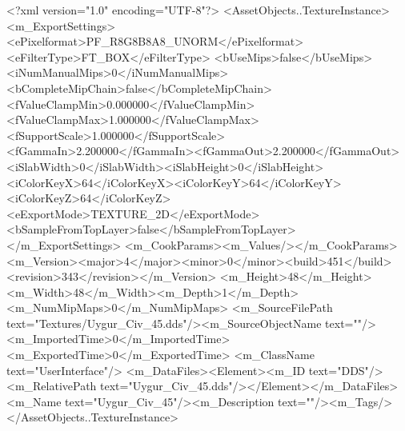 <?xml version="1.0" encoding="UTF-8"?>
<AssetObjects..TextureInstance>
  <m_ExportSettings>
    <ePixelformat>PF_R8G8B8A8_UNORM</ePixelformat><eFilterType>FT_BOX</eFilterType>
    <bUseMips>false</bUseMips><iNumManualMips>0</iNumManualMips><bCompleteMipChain>false</bCompleteMipChain>
    <fValueClampMin>0.000000</fValueClampMin><fValueClampMax>1.000000</fValueClampMax><fSupportScale>1.000000</fSupportScale>
    <fGammaIn>2.200000</fGammaIn><fGammaOut>2.200000</fGammaOut><iSlabWidth>0</iSlabWidth><iSlabHeight>0</iSlabHeight>
    <iColorKeyX>64</iColorKeyX><iColorKeyY>64</iColorKeyY><iColorKeyZ>64</iColorKeyZ>
    <eExportMode>TEXTURE_2D</eExportMode><bSampleFromTopLayer>false</bSampleFromTopLayer>
  </m_ExportSettings>
  <m_CookParams><m_Values/></m_CookParams>
  <m_Version><major>4</major><minor>0</minor><build>451</build><revision>343</revision></m_Version>
  <m_Height>48</m_Height><m_Width>48</m_Width><m_Depth>1</m_Depth><m_NumMipMaps>0</m_NumMipMaps>
  <m_SourceFilePath text="Textures/Uygur_Civ_45.dds"/><m_SourceObjectName text=""/>
  <m_ImportedTime>0</m_ImportedTime><m_ExportedTime>0</m_ExportedTime>
  <m_ClassName text="UserInterface"/>
  <m_DataFiles><Element><m_ID text="DDS"/><m_RelativePath text="Uygur_Civ_45.dds"/></Element></m_DataFiles>
  <m_Name text="Uygur_Civ_45"/><m_Description text=""/><m_Tags/>
</AssetObjects..TextureInstance>
